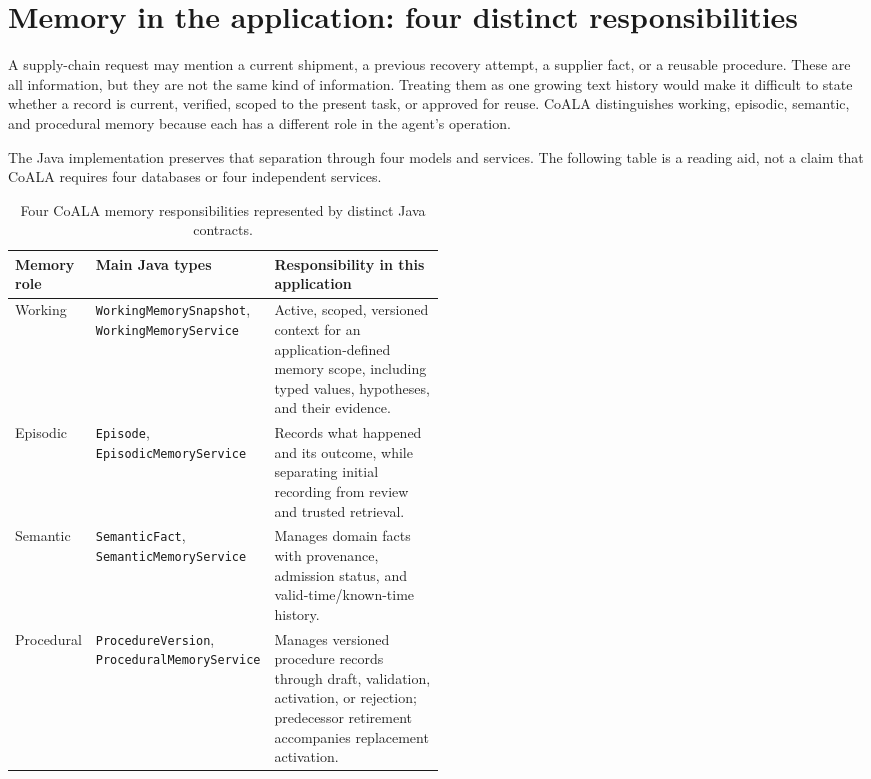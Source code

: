 \section{Memory in the application: four distinct responsibilities}
\label{sec:ch20-memory}

A supply-chain request may mention a current shipment, a previous recovery attempt, a supplier fact, or a reusable procedure. These are all information, but they are not the same kind of information. Treating them as one growing text history would make it difficult to state whether a record is current, verified, scoped to the present task, or approved for reuse. CoALA distinguishes working, episodic, semantic, and procedural memory because each has a different role in the agent's operation.

The Java implementation preserves that separation through four models and services. The following table is a reading aid, not a claim that CoALA requires four databases or four independent services.

\begin{table}[htbp]
\centering
\small
\begin{tabularx}{\linewidth}{>{\raggedright\arraybackslash}p{0.17\linewidth}>{\raggedright\arraybackslash}p{0.33\linewidth}X}
\toprule
\textbf{Memory role} & \textbf{Main Java types} & \textbf{Responsibility in this application} \\
\midrule
Working & \texttt{WorkingMemorySnapshot}, \texttt{WorkingMemoryService} & Active, scoped, versioned context for an application-defined memory scope, including typed values, hypotheses, and their evidence. \\
Episodic & \texttt{Episode}, \texttt{EpisodicMemoryService} & Records what happened and its outcome, while separating initial recording from review and trusted retrieval. \\
Semantic & \texttt{SemanticFact}, \texttt{SemanticMemoryService} & Manages domain facts with provenance, admission status, and valid-time/known-time history. \\
Procedural & \texttt{ProcedureVersion}, \texttt{ProceduralMemoryService} & Manages versioned procedure records through draft, validation, activation, or rejection; predecessor retirement accompanies replacement activation. \\
\bottomrule
\end{tabularx}
\caption{Four CoALA memory responsibilities represented by distinct Java contracts.}
\label{tab:ch20-memory-types}
\end{table}

